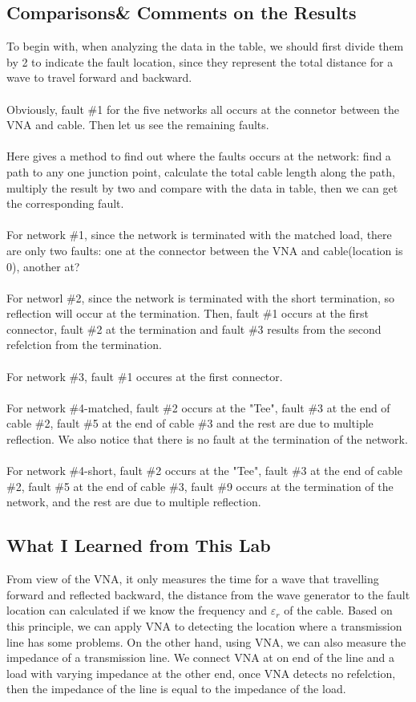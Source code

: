 \documentclass[11pt,oneside,a4paper]{report}
\begin{document}
\subsection*{Comparisons\& Comments on the Results}
To begin with, when analyzing the data in the table, we should first divide them by 2 to indicate the fault location, since they represent the total distance for a wave to travel forward and backward.\\
\\
Obviously, fault \#1 for the five networks all occurs at the connetor between the VNA and cable. Then let us see the remaining faults.\\
\\
Here gives a method to find out where the faults occurs at the network: find a path to any one junction point, calculate the total cable length along the path, multiply the result by two and compare with the data in table, then we can get the corresponding fault.\\
\\
For network \#1, since the network is terminated with the matched load, there are only two faults: one at the connector between the VNA and cable(location is 0), another at?\\
\\
For networl \#2, since the network is terminated with the short termination, so reflection will occur at the termination. Then, fault \#1 occurs at the first connector, fault \#2 at the termination and fault \#3 results from the second refelction from the termination.\\
\\
For network \#3, fault \#1 occures at the first connector.\\
\\
For network \#4-matched, fault \#2 occurs at the "Tee", fault \#3 at the end of cable \#2, fault \#5 at the end of cable \#3 and the rest are due to multiple reflection. We also notice that there is no fault at the termination of the network.\\
\\
For network \#4-short, fault \#2 occurs at the "Tee", fault \#3 at the end of cable \#2, fault \#5 at the end of cable \#3, fault \#9 occurs at the termination of the network, and the rest are due to multiple reflection.\\

\subsection*{What I Learned from This Lab}
From view of the VNA, it only measures the time for a wave that travelling forward and reflected backward, the distance from the wave generator to the fault location can calculated if we know the frequency and \(\varepsilon_r\) of the cable. Based on this principle, we can apply VNA to detecting the location where a transmission line has some problems. On the other hand, using VNA, we can also measure the impedance of a transmission line. We connect VNA at on end of the line and a load with varying impedance at the other end, once VNA detects no refelction, then the impedance of the line is equal to the impedance of the load.\\
\end{document}
